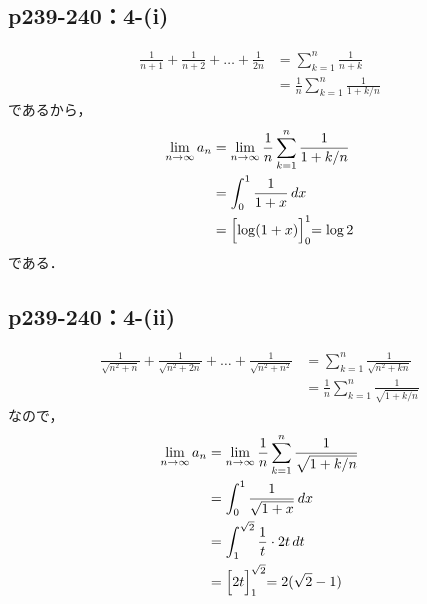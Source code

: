 \documentclass[a4paper,10pt,fleqn]{ltjsarticle}
\begin{document}
\subsection*{p239-240：4-(i)}

\begin{tleftbar}
    \begin{align*} 
        \frac{1}{n+1}+ \frac{1}{n+2}+\dots + \frac{1}{2n} & = \sum_{k=1}^{n} \frac{1}{n+k} \\
        & = \frac{1}{n} \sum_{k=1}^{n} \frac{1}{1+k/n} 
    \end{align*}
    であるから，
    \begin{align*} 
        \lim_{n \to \infty} a_n &= \lim_{n \to \infty} \frac{1}{n} \sum_{k=1}^{n} \frac{1}{1+k/n} \\
        & = \int_{0}^{1} \frac{1}{1+x} \, dx \\
        & = \Bigl [ \log (1+x) \Bigl]_{0}^{1} = \log 2
    \end{align*}
    である．
\end{tleftbar}



\subsection*{p239-240：4-(ii)}

\begin{tleftbar}
    \begin{align*} 
        \frac{1}{\sqrt{n^2+n}}+\frac{1}{\sqrt{n^2+2n}}+\dots+\frac{1}{\sqrt{n^2+n^2}}& = \sum_{k=1}^{n} \frac{1}{\sqrt{n^2+kn}} \\
        & = \frac{1}{n} \sum_{k=1}^{n} \frac{1}{\sqrt{1+k/n}}
    \end{align*}
    なので，
    \begin{align*} 
        \lim_{n \to \infty} a_n &= \lim_{n \to \infty} \frac{1}{n} \sum_{k=1}^{n} \frac{1}{\sqrt{1+k/n}} \\
        & =\int_{0}^{1} \frac{1}{\sqrt{1+x}} \, dx \\
        & =\int_{1}^{\sqrt{2}} \frac{1}{t} \cdot 2t \, dt \\
        & = \Bigl[2t \Bigl ]_{1}^{\sqrt{2}} =2(\sqrt{2}-1)
    \end{align*}
\end{tleftbar}
\end{document}
